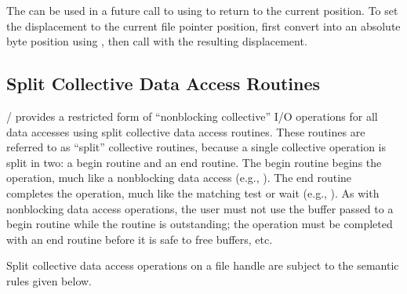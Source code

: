 \begin{users}
The  can be used in a future call
to 
using  to return to the current position.
To set the displacement to the current file pointer position,
first convert  into an absolute byte position using
,
then call  with the resulting
displacement.
\end{users}

\subsection{Split Collective Data Access Routines}
\label{sec:io-split-collective}

\MPI/ provides a restricted form of ``nonblocking collective'' I/O
operations for all data accesses
using split collective data access routines.
These routines are referred to as ``split'' collective routines,
because a single collective operation is split in two:
a begin routine and an end routine.
The begin routine begins the operation,
much like a nonblocking data access (e.g., ).
The end routine completes the operation,
much like the matching test or wait (e.g., ).
As with nonblocking data access operations,
the user must not use the buffer
passed to a begin routine while the routine is outstanding;
the operation must be completed with an end routine before it
is safe to free buffers, etc.

Split collective data access operations on a file handle 
are subject to the semantic rules given below.

